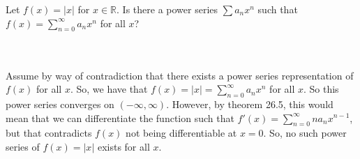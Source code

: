 Let $f(x)=|x|$ for $x\in\mathbb{R}$. Is there a power series $\sum a_nx^n$ such that
$f(x)=\sum_{n=0}^{\infty} a_nx^n$ for all $x$?\\\\

\begin{solution}\renewcommand{\qedsymbol}{}\ \\
    Assume by way of contradiction that there exists a power series representation of $f(x)$ for all
    $x$. So, we have that $f(x)=|x|=\sum_{n=0}^{\infty} a_nx^n$ for all $x$. So this power series
    converges on $(-\infty,\infty)$. However, by theorem 26.5, this would mean that we can differentiate
    the function such that $f'(x)=\sum_{n=0}^{\infty} na_nx^{n-1}$, but that contradicts $f(x)$ not
    being differentiable at $x=0$. So, no such power series of $f(x)=|x|$ exists for all $x$.

\end{solution}